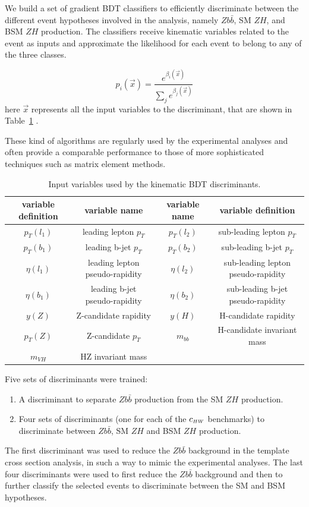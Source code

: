 We build a set of gradient BDT classifiers to efficiently discriminate
between the different event hypotheses involved in the analysis, namely $Z b\bar{b}$,
SM $Z H$, and BSM $Z H$ production. 
The classifiers receive kinematic variables related to the event as inputs and approximate
the likelihood for each event to belong to any of the three classes.

\begin{equation}
p_{i}(\vec x) = \frac{ e^{\beta_{i}(\vec x) } }{ \sum_j e^{\beta_{j}(\vec x) } }
\end{equation}
here $\vec x$ represents all the input variables to the discriminant, that are shown in Table~\ref{tab:bdt_features} .

These kind of algorithms are regularly used by the experimental analyses and often provide a comparable performance to those of more sophisticated techniques such as matrix element methods. 
%
\begin{table}[h!]
\centering
\begin{tabular}{||c|c||c|c||}
variable definition & variable name &  variable name & variable definition \\
\hline
$p_T(l_1)$ & leading lepton $p_T$ & $p_T(l_2)$ & sub-leading lepton $p_T$\\
$p_T(b_1)$ & leading b-jet $p_T$ & $p_T(b_2)$ & sub-leading b-jet $p_T$\\
$\eta(l_1)$ & leading lepton pseudo-rapidity & $\eta(l_2)$ & sub-leading lepton pseudo-rapidity\\
$\eta(b_1)$ & leading b-jet pseudo-rapidity  & $\eta(b_2)$ & sub-leading b-jet  pseudo-rapidity\\
$y(Z)$ & Z-candidate rapidity  & $y(H)$ & H-candidate rapidity \\
$p_T(Z)$ & Z-candidate $p_T$  & $m_{bb}$ & H-candidate invariant mass \\
$m_{VH}$ & HZ invariant mass  &  &  \\
\end{tabular}
\caption{
\label{tab:bdt_features}
Input variables used by the kinematic BDT discriminants.
}
\end{table}

Five sets of discriminants were trained:
\begin{enumerate}
\item A  discriminant to separate $Z b\bar{b}$ production from the SM $Z H$ production.
\item Four sets of  discriminants (one for each of the $c_{\scriptscriptstyle HW}$ benchmarks) to
    discriminate between $Z b\bar{b}$, SM $Z H$ and BSM $Z H$ production.
\end{enumerate}
The first discriminant was used to reduce the $Z b\bar{b}$ background in the template
cross section analysis, in such a way to mimic the experimental analyses.
The last four discriminants were used to first reduce the $Z b\bar{b}$ background and then to further classify the selected events to discriminate between the SM and BSM hypotheses.

